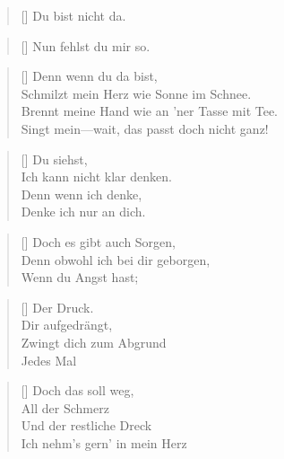 \documentclass[twocolumn]{article}
\title{
	\vspace{-3cm}
	\begin{flushleft}
		\titlevar \quad \raisebox{0.15em}{\normalsize(\authorvar)}
	\end{flushleft}
	}
\date{
	\vspace{-1.2cm}
	\begin{flushleft}
		\datevar
	\end{flushleft} 
	}
\newenvironment{Strophe}{\begin{minipage}{\versewidth} \begin{verse}[\versewidth]}{\end{verse} \end{minipage}\vspace{0.5em}}
\begin{document}
	\maketitle
	\thispagestyle{empty}
	
	\begin{Strophe}
		Du bist nicht da.
	\end{Strophe}
	
	\begin{Strophe}
		Nun fehlst du mir so.
	\end{Strophe}
	
	\begin{Strophe}
		Denn wenn du da bist, \\
		Schmilzt mein Herz wie Sonne im Schnee. \\
		Brennt meine Hand wie an 'ner Tasse mit Tee. \\
		Singt mein—wait, das passt doch nicht ganz! \\
	\end{Strophe}
	
	\begin{Strophe}
		Du siehst, \\
		Ich kann nicht klar denken. \\
		Denn wenn ich denke, \\
		Denke ich nur an dich. \\
	\end{Strophe}
	
	\begin{Strophe}
		Doch es gibt auch Sorgen, \\
		Denn obwohl ich bei dir geborgen, \\
		Wenn du Angst hast; \\
	\end{Strophe}
	
	\begin{Strophe}
		Der Druck. \\
		Dir aufgedrängt, \\
		Zwingt dich zum Abgrund \\
		Jedes Mal \\
	\end{Strophe}
	
	\begin{Strophe}
		Doch das soll weg, \\
		All der Schmerz \\
		Und der restliche Dreck \\
		Ich nehm's gern' in mein Herz  \\
	\end{Strophe}
	
\end{document}
